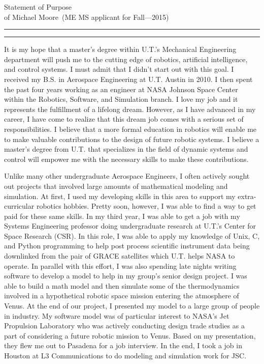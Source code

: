 \documentclass{article}
\newcommand{\soptitle}{Statement of Purpose}
\newcommand{\yourname}{Michael Moore}
\begin{document}
\begin{center}\LARGE\soptitle\\
\large of \yourname\ (ME MS applicant for Fall---2015)
\end{center}

\hrule
\vspace{1pt}
\hrule height 1pt

\bigskip

It is my hope that a master's degree within U.T.'s Mechanical Engineering department will push me
to the cutting edge of robotics, artificial intelligence, and control
systems. I must admit that I didn't start out with this goal. I received my B.S. in Aerospace Engineering at U.T. Austin in 2010. I then spent the past four years working as 
an engineer at NASA Johnson Space Center within the Robotics, Software, and Simulation branch. I love my job
and it represents the fulfillment of a lifelong dream. However, as I have advanced in
my career, I have come to realize that this dream job comes with a serious set of responsibilities.
I believe that a more formal education in robotics will enable me to make valuable contributions to the
design of future robotic systems. I believe a master's degree from U.T. that specializes in the field of dynamic systems and control will empower me with the necessary skills to make these contributions.

Unlike many other undergraduate Aerospace Engineers, I often actively sought out projects that involved
large amounts of mathematical modeling and simulation. At first, I used my developing skills in this area to support my extra-curricular robotics hobbies. Pretty soon, however, I was able to find a way to get paid for these same skills. In my third year, I was able to get a job with my Systems Engineering professor doing undergraduate research at U.T.'s Center for Space Research (CSR). In this role, I was able to apply my knowledge of Unix, C, and Python programming to help post process scientific instrument data being downlinked
from the pair of GRACE satellites which U.T. helps NASA to operate. In parallel with this effort,
I was also spending late nights writing software to develop a model to help in my group's senior design project.
I was able to build a math model and then simulate some of the thermodynamics involved in a hypothetical
robotic space mission entering the atmosphere of Venus. At the end of our project, I presented my model to a
large group of people in industry. My software model was of particular interest to NASA's Jet Propulsion
Laboratory who was actively conducting design trade studies as a part of considering a future robotic 
mission to Venus. Based on my presentation, they flew me out to Pasadena for a job interview. In the end,
I took a job in Houston at L3 Communications to do modeling and simulation work for JSC. 
\end{document}
